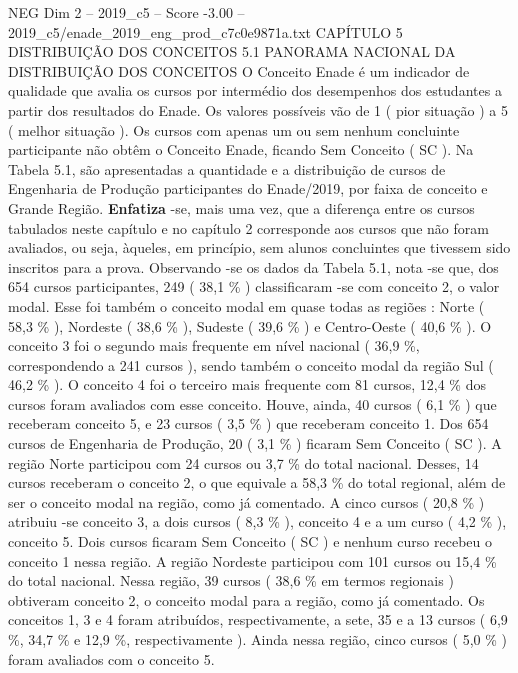 \begin{textsample}{NEG Dim 2 – 2019\_c5 – Score -3.00 – 2019\_c5/enade\_2019\_eng\_prod\_c7c0e9871a.txt}  \label{ex:f2_neg_091}
CAPÍTULO 5 DISTRIBUIÇÃO DOS CONCEITOS 5.1 PANORAMA NACIONAL DA DISTRIBUIÇÃO DOS CONCEITOS O Conceito Enade é um indicador de qualidade que avalia os cursos por intermédio dos desempenhos dos estudantes a partir dos resultados do Enade.
Os valores possíveis vão de 1 ( pior situação ) a 5 ( melhor situação ).
Os cursos com apenas um ou sem nenhum concluinte participante não obtêm o Conceito Enade, ficando Sem Conceito ( SC ).
Na Tabela 5.1, são apresentadas a quantidade e a distribuição de cursos de Engenharia de Produção participantes do Enade/2019, por faixa de conceito e Grande Região. \textbf{Enfatiza} -se, mais uma vez, que a diferença entre os cursos tabulados neste capítulo e no capítulo 2 corresponde aos cursos que não foram avaliados, ou seja, àqueles, em princípio, sem alunos concluintes que tivessem sido inscritos para a prova.
Observando -se os dados da Tabela 5.1, nota -se que, dos 654 cursos participantes, 249 ( 38,1 \% ) classificaram -se com conceito 2, o valor modal.
Esse foi também o conceito modal em quase todas as regiões : Norte ( 58,3 \% ), Nordeste ( 38,6 \% ), Sudeste ( 39,6 \% ) e Centro-Oeste ( 40,6 \% ).
O conceito 3 foi o segundo mais frequente em nível nacional ( 36,9 \%, correspondendo a 241 cursos ), sendo também o conceito modal da região Sul ( 46,2 \% ).
O conceito 4 foi o terceiro mais frequente com 81 cursos, 12,4 \% dos cursos foram avaliados com esse conceito.
Houve, ainda, 40 cursos ( 6,1 \% ) que receberam conceito 5, e 23 cursos ( 3,5 \% ) que receberam conceito 1.
Dos 654 cursos de Engenharia de Produção, 20 ( 3,1 \% ) ficaram Sem Conceito ( SC ).
A região Norte participou com 24 cursos ou 3,7 \% do total nacional.
Desses, 14 cursos receberam o conceito 2, o que equivale a 58,3 \% do total regional, além de ser o conceito modal na região, como já comentado.
A cinco cursos ( 20,8 \% ) atribuiu -se conceito 3, a dois cursos ( 8,3 \% ), conceito 4 e a um curso ( 4,2 \% ), conceito 5.
Dois cursos ficaram Sem Conceito ( SC ) e nenhum curso recebeu o conceito 1 nessa região.
A região Nordeste participou com 101 cursos ou 15,4 \% do total nacional.
Nessa região, 39 cursos ( 38,6 \% em termos regionais ) obtiveram conceito 2, o conceito modal para a região, como já comentado.
Os conceitos 1, 3 e 4 foram atribuídos, respectivamente, a sete, 35 e a 13 cursos ( 6,9 \%, 34,7 \% e 12,9 \%, respectivamente ).
Ainda nessa região, cinco cursos ( 5,0 \% ) foram avaliados com o conceito 5.

\end{textsample}
